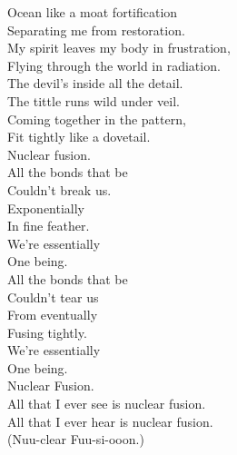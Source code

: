 Ocean like a moat fortification \\
Separating me from restoration. \\
My spirit leaves my body in frustration, \\
Flying through the world in radiation. \\

The devil's inside all the detail. \\
The tittle runs wild under veil. \\
Coming together in the pattern, \\
Fit tightly like a dovetail. \\

Nuclear fusion. \\

All the bonds that be \\
Couldn't break us. \\
Exponentially \\
In fine feather. \\
We're essentially \\
One being. \\

All the bonds that be \\
Couldn't tear us \\
From eventually \\
Fusing tightly. \\
We're essentially \\
One being. \\
Nuclear Fusion. \\

All that I ever see is nuclear fusion. \\
All that I ever hear is nuclear fusion. \\

(Nuu-clear Fuu-si-ooon.) \\





